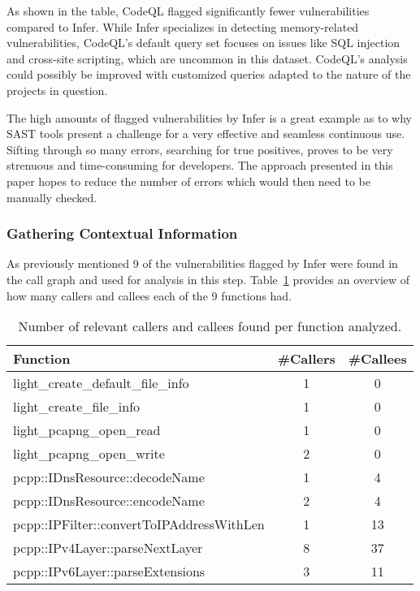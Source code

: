 As shown in the table, CodeQL flagged significantly fewer vulnerabilities compared to Infer. While Infer specializes in detecting memory-related vulnerabilities, CodeQL's default query set focuses on issues like SQL injection and cross-site scripting, which are uncommon in this dataset. CodeQL's analysis could possibly be improved with customized queries adapted to the nature of the projects in question.

The high amounts of flagged vulnerabilities by Infer is a great example as to why SAST tools present a challenge for a very effective and seamless continuous use. Sifting through so many errors, searching for true positives, proves to be very strenuous and time-consuming for developers. The approach presented in this paper hopes to reduce the number of errors which would then need to be manually checked.

\subsubsection{Gathering Contextual Information}
As previously mentioned 9 of the vulnerabilities flagged by Infer were found in the call graph and used for analysis in this step. Table~\ref{context} provides an overview of how many callers and callees each of the 9 functions had.

\begin{table}[ht]
\centering
\caption{Number of relevant callers and callees found per function analyzed.}
\label{context}
\begin{tabular}{|l|c|c|}
\hline
\textbf{Function} & \textbf{\#Callers} & \textbf{\#Callees} \\
\hline
light\_create\_default\_file\_info & 1 & 0 \\
light\_create\_file\_info & 1 & 0 \\
light\_pcapng\_open\_read & 1 & 0 \\
light\_pcapng\_open\_write & 2 & 0 \\
pcpp::IDnsResource::decodeName & 1 & 4 \\
pcpp::IDnsResource::encodeName & 2 & 4 \\
pcpp::IPFilter::convertToIPAddressWithLen & 1 & 13 \\
pcpp::IPv4Layer::parseNextLayer & 8 & 37 \\
pcpp::IPv6Layer::parseExtensions & 3 & 11 \\
\hline
\end{tabular}
\end{table}

